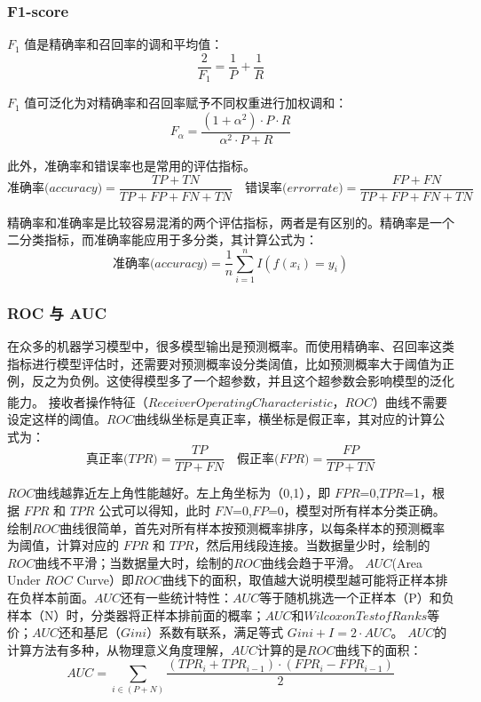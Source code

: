 \documentclass[withoutpreface,bwprint]{cumcmthesis}
\begin{document}
\subsubsection{F1-score}

\( F_1 \) 值是精确率和召回率的调和平均值：
\[ \frac{2}{F_1} = \frac{1}{P} + \frac{1}{R} \]

\( F_1 \) 值可泛化为对精确率和召回率赋予不同权重进行加权调和：
\[ F_{\alpha} = \frac{(1+\alpha^2)\cdot P\cdot R}{\alpha^2\cdot P+R} \]

此外，准确率和错误率也是常用的评估指标。
\[ \text{准确率(\(accuracy\))} = \frac{TP + TN}{TP + FP + FN + TN} \quad \text{错误率(\(error rate)\)} = \frac{FP + FN}{TP + FP + FN + TN} \]

精确率和准确率是比较容易混淆的两个评估指标，两者是有区别的。精确率是一个二分类指标，而准确率能应用于多分类，其计算公式为：
\[ \text{准确率(\(accuracy\))} = \frac{1}{n} \sum^n_{i=1} I(f(x_i)=y_i) \]

\subsubsection{ROC 与 AUC}

在众多的机器学习模型中，很多模型输出是预测概率。而使用精确率、召回率这类指标进行模型评估时，还需要对预测概率设分类阔值，比如预测概率大于阈值为正例，反之为负例。这使得模型多了一个超参数，并且这个超参数会影响模型的泛化能力。
接收者操作特征\textsuperscript{\cite{eng2005receiver}}（\(Receiver Operating Characteristic\)，\(ROC\)）曲线不需要设定这样的阈值。\(ROC\)曲线纵坐标是真正率，横坐标是假正率，其对应的计算公式为：
\[ \text{真正率(\(TPR\))} = \frac{TP}{TP+FN} \quad \text{假正率(\(FPR\))} = \frac{FP}{TP+TN} \]

\(ROC\)曲线越靠近左上角性能越好。左上角坐标为（0,1），即 \(FPR\)=0,\(TPR\)=1，根据 \(FPR\) 和 \(TPR\) 公式可以得知，此时 \(FN\)=0,\(FP\)=0，模型对所有样本分类正确。
绘制\(ROC\)曲线很简单，首先对所有样本按预测概率排序，以每条样本的预测概率为阈值，计算对应的 \(FPR\) 和 \(TPR\)，然后用线段连接。当数据量少时，绘制的\(ROC\)曲线不平滑；当数据量大时，绘制的\(ROC\)曲线会趋于平滑。
\(AUC\)(Area Under \(ROC\) Curve）即\(ROC\)曲线下的面积，取值越大说明模型越可能将正样本排在负样本前面。\(AUC\)还有一些统计特性：\(AUC\)等于随机挑选一个正样本（P）和负样本（N）时，分类器将正样本排前面的概率；\(AUC\)和\(Wilcoxon Test of Ranks\)等价；\(AUC\)还和基尼（\(Gini\)）系数有联系，满足等式 \( Gini + I = 2 \cdot AUC \)。
\(AUC\)的计算方法有多种，从物理意义角度理解，\(AUC\)计算的是\(ROC\)曲线下的面积：
\[ AUC = \sum_{i\in(P+N)} \frac{(TPR_i+TPR_{i-1})\cdot(FPR_i-FPR_{i-1})}{2} \]
\end{document}
